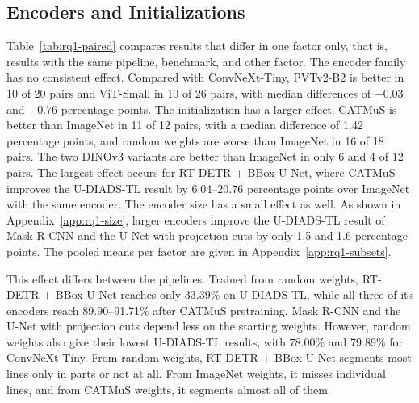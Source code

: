 \label{sec:results-rq12}\label{sec:results-rq13}


\FloatBarrier

\subsection{Encoders and Initializations}
\label{sec:results-rq1-summary}

Table~\ref{tab:rq1-paired} compares results that differ in one factor only, that is, results with the same pipeline, benchmark, and other factor. The encoder family has no consistent effect. Compared with ConvNeXt-Tiny, PVTv2-B2 is better in 10 of 20 pairs and ViT-Small in 10 of 26 pairs, with median differences of $-0.03$ and $-0.76$ percentage points. The initialization has a larger effect. CATMuS is better than ImageNet in 11 of 12 pairs, with a median difference of 1.42 percentage points, and random weights are worse than ImageNet in 16 of 18 pairs. The two DINOv3 variants are better than ImageNet in only 6 and 4 of 12 pairs. The largest effect occurs for RT-DETR + BBox U-Net, where CATMuS improves the U-DIADS-TL result by 6.04--20.76 percentage points over ImageNet with the same encoder. The encoder size has a small effect as well. As shown in Appendix~\ref{app:rq1-size}, larger encoders improve the U-DIADS-TL result of Mask R-CNN and the U-Net with projection cuts by only 1.5 and 1.6 percentage points. The pooled means per factor are given in Appendix~\ref{app:rq1-subsets}.

This effect differs between the pipelines. Trained from random weights, RT-DETR + BBox U-Net reaches only 33.39\% on U-DIADS-TL, while all three of its encoders reach 89.90--91.71\% after CATMuS pretraining. Mask R-CNN and the U-Net with projection cuts depend less on the starting weights. However, random weights also give their lowest U-DIADS-TL results, with 78.00\% and 79.89\% for ConvNeXt-Tiny. From random weights, RT-DETR + BBox U-Net segments most lines only in parts or not at all. From ImageNet weights, it misses individual lines, and from CATMuS weights, it segments almost all of them.


